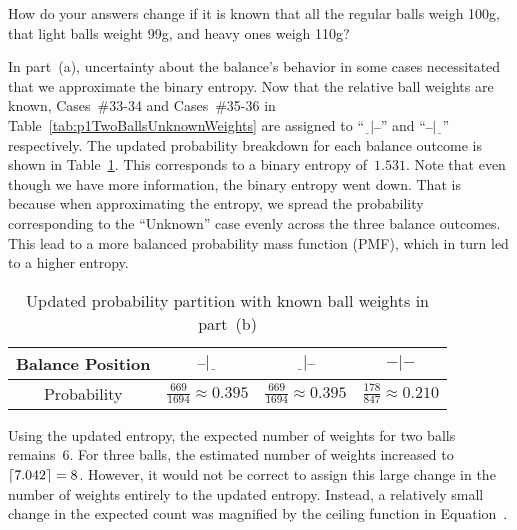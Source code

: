 \begin{subproblem}
  How do your answers change if it is known that all the regular balls weigh 100g, that light balls weight 99g, and heavy ones weigh 110g?
\end{subproblem}

  In part~(a), uncertainty about the balance's behavior in some cases necessitated that we approximate the binary entropy.  Now that the relative ball weights are known, Cases~\#33-34 and Cases~\#35-36 in Table~\ref{tab:p1TwoBallsUnknownWeights} are assigned to ``${\underline{~~}|\bar{~}\bar{~}}$'' and ``${\bar{~}\bar{~}|\underline{~~}}$'' respectively.  The updated probability breakdown for each balance outcome is shown in Table~\ref{tab:twoBallProbabilityBreakdownKnownWeights}.  This corresponds to a binary entropy of~$1.531$.  Note that even though we have more information, the binary entropy went down.  That is because when approximating the entropy, we spread the probability corresponding to the ``Unknown'' case evenly across the three balance outcomes.  This lead to a more balanced probability mass function (PMF), which in turn led to a higher entropy.

  \begin{table}
    \centering
    \caption{Updated probability partition with known ball weights in part~(b)}\label{tab:twoBallProbabilityBreakdownKnownWeights}
    \begin{tabular}{|c||c|c|c|}
      \hline
      Balance Position & $\bar{~}\bar{~}|\underline{~~}$  & $\underline{~~}|\bar{~}\bar{~}$  & $-|-$ \\\hline
      Probability      & $\frac{669}{1694} \approx 0.395$ & $\frac{669}{1694} \approx 0.395$ & $\frac{178}{847} \approx 0.210$   \\\hline
    \end{tabular}
  \end{table}

  Using the updated entropy, the expected number of weights for two balls remains~6.  For three balls, the estimated number of weights increased to~${\ceil*{7.042} = 8}$.  However, it would not be correct to assign this large change in the number of weights entirely to the updated entropy.  Instead, a relatively small change in the expected count was magnified by the ceiling function in Equation~.

